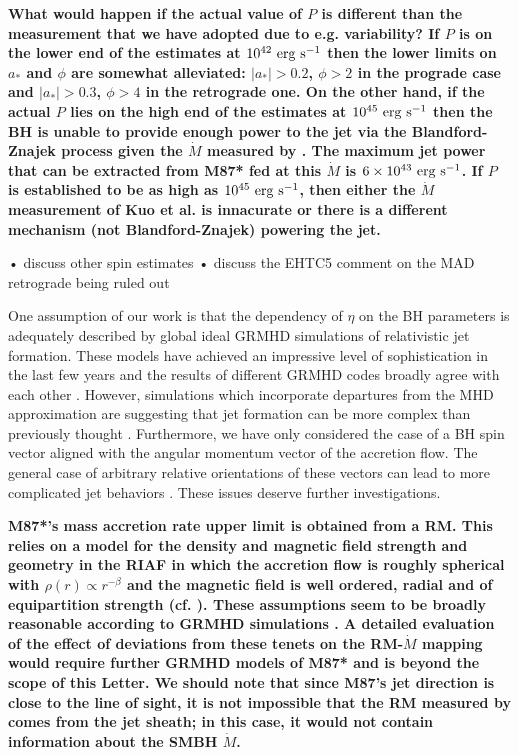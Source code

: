 \documentclass[twocolumn, linenumbers]{aastex62} %
\begin{document}
\textbf{What would happen if the actual value of $P$ is different than the measurement that we have adopted due to e.g. variability? If $P$ is on the lower end of the estimates at $10^{42} \ {\rm erg \ s}^{-1}$  then the lower limits on $a_*$ and $\phi$ are somewhat alleviated: $|a_*| > 0.2$, $\phi > 2$ in the prograde case and $|a_*| > 0.3$, $\phi > 4$ in the retrograde one. On the other hand, if the actual $P$ lies on the high end of the estimates at $10^{45} \ {\rm erg \ s}^{-1}$  then the BH is unable to provide enough power to the jet via the Blandford-Znajek process given the $\dot{M}$ measured by \cite{Kuo2014}. The maximum jet power that can be extracted from M87* fed at this $\dot{M}$ is $6 \times 10^{43} \ {\rm erg \ s}^{-1}$. If $P$ is established to be as high as $10^{45} \ {\rm erg \ s}^{-1}$, then either the $\dot{M}$ measurement of Kuo et al. is innacurate or there is a different mechanism (not Blandford-Znajek) powering the jet.}

• discuss other spin estimates 
• discuss the EHTC5 comment on the MAD retrograde being ruled out

One assumption of our work is that the dependency of $\eta$ on the BH parameters is adequately described by global ideal GRMHD simulations of relativistic jet formation. These models have achieved an impressive level of sophistication in the last few years and the results of different GRMHD codes broadly agree with each other . However, simulations which incorporate departures from the MHD approximation are suggesting that jet formation can be more complex than previously thought \citep{Parfrey2019}. Furthermore, we have only considered the case of a BH spin vector aligned with the angular momentum vector of the accretion flow. The general case of arbitrary relative orientations of these vectors can lead to more complicated jet behaviors \citep{Liska2018}. These issues deserve further investigations. 

\textbf{M87*'s mass accretion rate upper limit is obtained from a RM. This relies on a model for the density and magnetic field strength and geometry in the RIAF in which the accretion flow is roughly spherical with $\rho(r) \propto r^{-\beta}$ and the magnetic field is well ordered, radial and of equipartition strength (cf. \citealt{Marrone2006,Kuo2014}). These assumptions seem to be broadly reasonable according to GRMHD simulations . A detailed evaluation of the effect of deviations from these tenets on the RM-$\dot{M}$ mapping would require further GRMHD models of M87* and is beyond the scope of this Letter. We should note that since M87's jet direction is close to the line of sight, it is not impossible that the RM measured by \cite{Kuo2014} comes from the jet sheath; in this case, it would not contain information about the SMBH $\dot{M}$. }
\end{document}
